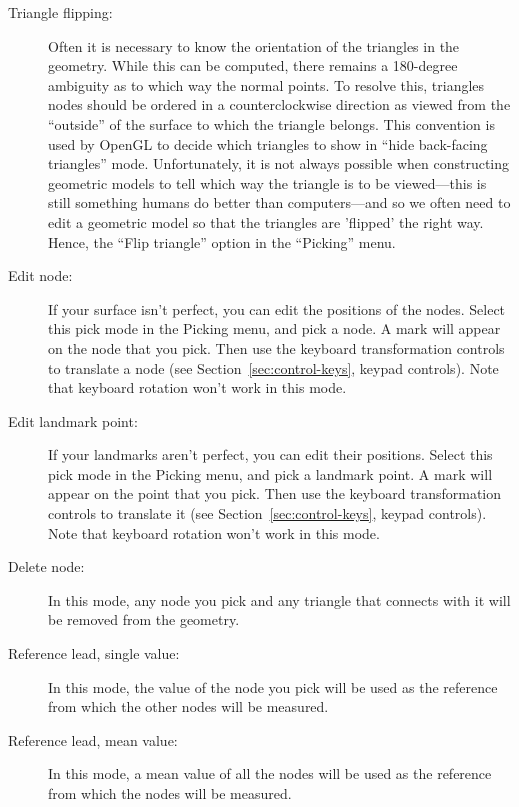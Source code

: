 \begin{description}
  \item[Triangle flipping: ] Often it is necessary to know the orientation
    of the triangles in the geometry.  While this can be computed, there
    remains a 180-degree ambiguity as to which way the normal points.  To
    resolve this, triangles nodes should be ordered in a counterclockwise
    direction as viewed from the ``outside'' of the surface to which the
    triangle belongs.  This convention is used by OpenGL to decide which
    triangles to show in ``hide back-facing triangles'' mode.
    Unfortunately, it is not always possible when constructing geometric
    models to tell which way the triangle is to be viewed---this is still
    something humans do better than computers---and so we often need to
    edit a geometric model so that the triangles are 'flipped' the right
    way.  Hence, the ``Flip triangle'' option in the ``Picking'' menu.
    
  \item[Edit node: ] If your surface isn't perfect, you can edit the
    positions of the nodes.  Select this pick mode in the Picking menu, and
    pick a node.  A mark will appear on the node that you pick.  Then use
    the keyboard transformation controls to translate a node (see
    Section~\ref{sec:control-keys}, keypad controls).  Note that keyboard
    rotation won't work in this mode.
    
  \item[Edit landmark point: ] If your landmarks aren't perfect, you can
    edit their positions.  Select this pick mode in the Picking menu, and
    pick a landmark point.  A mark will appear on the point that you pick.
    Then use the keyboard transformation controls to translate it (see
    Section~\ref{sec:control-keys}, keypad controls).  Note that keyboard
    rotation won't work in this mode.
    
  \item[Delete node: ] In this mode, any node you pick and any triangle
    that connects with it will be removed from the geometry.
    
  \item[Reference lead, single value: ] In this mode, the value of the node
    you pick will be used as the reference from which the other nodes will
    be measured.
    
  \item[Reference lead, mean value: ] In this mode, a mean value of all the
    nodes will be used as the reference from which the nodes will be
    measured.
\end{description}


